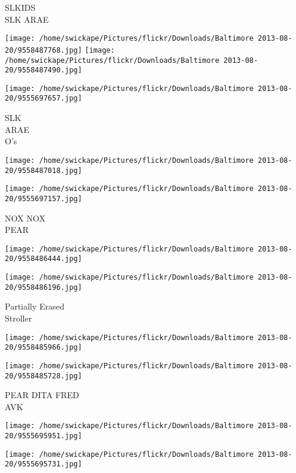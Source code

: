 \documentclass[10pt,letterpaper]{article}
\begin{document}
SLKIDS\\
SLK ARAE\\
\pagebreak

\texttt{[image: /home/swickape/Pictures/flickr/Downloads/Baltimore 2013-08-20/9558487768.jpg]}
\texttt{[image: /home/swickape/Pictures/flickr/Downloads/Baltimore 2013-08-20/9558487490.jpg]}

\texttt{[image: /home/swickape/Pictures/flickr/Downloads/Baltimore 2013-08-20/9555697657.jpg]}

SLK\\
ARAE\\
O's\\
\pagebreak

\texttt{[image: /home/swickape/Pictures/flickr/Downloads/Baltimore 2013-08-20/9558487018.jpg]}

\vspace{0.25in}
\texttt{[image: /home/swickape/Pictures/flickr/Downloads/Baltimore 2013-08-20/9555697157.jpg]}

NOX NOX\\
PEAR\\
\pagebreak

\texttt{[image: /home/swickape/Pictures/flickr/Downloads/Baltimore 2013-08-20/9558486444.jpg]}

\vspace{0.25in}
\texttt{[image: /home/swickape/Pictures/flickr/Downloads/Baltimore 2013-08-20/9558486196.jpg]}

Partially Erased\\
Stroller\\
\pagebreak

\texttt{[image: /home/swickape/Pictures/flickr/Downloads/Baltimore 2013-08-20/9558485966.jpg]}

\vspace{0.25in}
\texttt{[image: /home/swickape/Pictures/flickr/Downloads/Baltimore 2013-08-20/9558485728.jpg]}

PEAR DITA FRED\\
AVK\\
\pagebreak

\texttt{[image: /home/swickape/Pictures/flickr/Downloads/Baltimore 2013-08-20/9555695951.jpg]}

\vspace{0.25in}
\texttt{[image: /home/swickape/Pictures/flickr/Downloads/Baltimore 2013-08-20/9555695731.jpg]}
\end{document}
